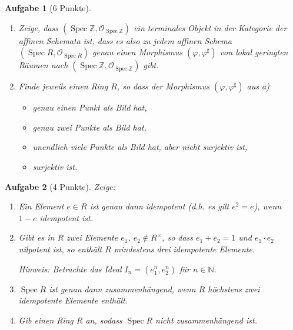\documentclass[a4paper, 12pt, numbers=noendperiod, chapterprefix=true]{scrbook}
\theoremstyle{break}
\newtheorem{Aufg}{Aufgabe}
\theoremstyle{nonumberbreak}
\theoremstyle{nonumberplain}
\DeclareMathOperator{\Spec}{Spec}
\newcommand{\N}{\mathbb{N}}
\newcommand{\Z}{\mathbb{Z}}
\newcommand{\calO}{\mathcal{O}}
\begin{document}
\begin{Aufg}[6 Punkte]
 \begin{enumerate}%
 \item Zeige, dass $(\Spec \Z, \calO_{\Spec \Z})$ ein terminales Objekt in der Kategorie der affinen Schemata ist, dass es also zu jedem affinen Schema $(\Spec R,\calO_{\Spec R})$ genau einen Morphismus $(\varphi, \varphi^\sharp)$ von lokal geringten R\"aumen nach $(\Spec \Z, \calO_{\Spec \Z})$ gibt. 
  \item Finde jeweils einen Ring $R$, so dass der Morphismus $(\varphi, \varphi^\sharp)$ aus a)
 \begin{itemize}
  \item genau einen Punkt als Bild hat,
  \item genau zwei Punkte als Bild hat,
  \item unendlich viele Punkte als Bild hat, aber nicht surjektiv ist,
  \item surjektiv ist.
 \end{itemize}
\end{enumerate}
\end{Aufg}


\begin{Aufg}[4 Punkte]
Zeige:
\begin{enumerate}%
 \item Ein Element $e\in R$ ist genau dann idempotent (d.h. es gilt $e^2 = e$), wenn $1-e$ idempotent ist.
 \item Gibt es in $R$ zwei Elemente $e_1$, $e_2 \not\in R^\times$, so dass $e_1+e_2 =1$ und $e_1\cdot e_2$ nilpotent ist, so enth\"alt $R$ mindestens drei idempotente Elemente.
 
 \textit{Hinweis: Betrachte das Ideal $I_n = (e_1^n, e_2^n)$ f\"ur $n\in \N$.}
 \item $\Spec R$ ist genau dann zusammenh\"angend, wenn $R$ h\"ochstens zwei idempotente Elemente enth\"alt.
 \item Gib einen Ring $R$ an, sodass $\Spec R$ nicht zusammenh\"angend ist.
\end{enumerate}
\end{Aufg}
\end{document}
